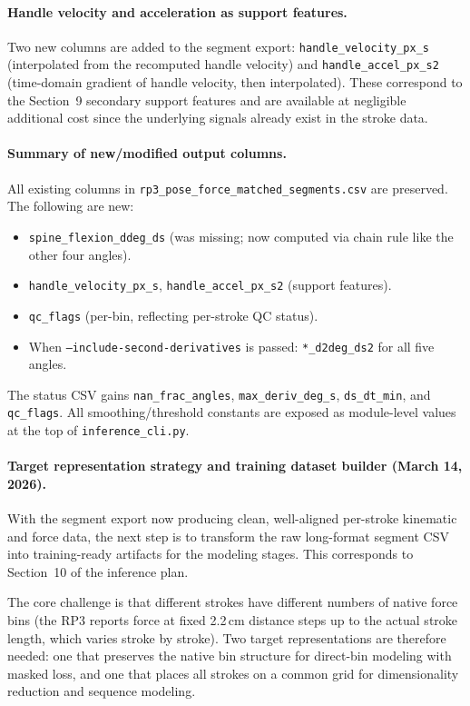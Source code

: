 \documentclass[11pt]{article}
\begin{document}
\paragraph{Handle velocity and acceleration as support features.}
Two new columns are added to the segment export: \texttt{handle\_velocity\_px\_s} (interpolated from the recomputed handle velocity) and \texttt{handle\_accel\_px\_s2} (time-domain gradient of handle velocity, then interpolated). These correspond to the Section~9 secondary support features and are available at negligible additional cost since the underlying signals already exist in the stroke data.

\paragraph{Summary of new/modified output columns.}
All existing columns in \texttt{rp3\_pose\_force\_matched\_segments.csv} are preserved. The following are new:
\begin{itemize}
	\item \texttt{spine\_flexion\_ddeg\_ds} (was missing; now computed via chain rule like the other four angles).
	\item \texttt{handle\_velocity\_px\_s}, \texttt{handle\_accel\_px\_s2} (support features).
	\item \texttt{qc\_flags} (per-bin, reflecting per-stroke QC status).
	\item When \texttt{--include-second-derivatives} is passed: \texttt{*\_d2deg\_ds2} for all five angles.
\end{itemize}
The status CSV gains \texttt{nan\_frac\_angles}, \texttt{max\_deriv\_deg\_s}, \texttt{ds\_dt\_min}, and \texttt{qc\_flags}. All smoothing/threshold constants are exposed as module-level values at the top of \texttt{inference\_cli.py}.

\paragraph{Target representation strategy and training dataset builder (March 14, 2026).}
With the segment export now producing clean, well-aligned per-stroke kinematic and force data, the next step is to transform the raw long-format segment CSV into training-ready artifacts for the modeling stages. This corresponds to Section~10 of the inference plan.

The core challenge is that different strokes have different numbers of native force bins (the RP3 reports force at fixed 2.2\,cm distance steps up to the actual stroke length, which varies stroke by stroke). Two target representations are therefore needed: one that preserves the native bin structure for direct-bin modeling with masked loss, and one that places all strokes on a common grid for dimensionality reduction and sequence modeling.
\end{document}
